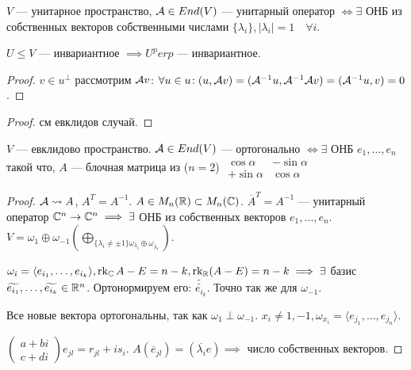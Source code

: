 \begin{theorem}
    $V$ --- унитарное пространство,  $\mathcal{A} \in End(V)$ --- унитарный оператор  $\iff \exists$ ОНБ из собственных векторов  собственными числами  $\{\lambda_i\}, |\lambda_i| = 1 \quad \forall i$.
\end{theorem}
\begin{lemma}
    $U \le V$ --- инвариантное $\implies U^perp$ --- инвариантное.
\end{lemma}
\begin{proof}
    $v \in u^\perp$ рассмотрим  $\mathcal{A} v$:  $\forall u \in u\!: (u, \mathcal{A} v) = (\mathcal{A}^{-1}u, \mathcal{A}^{-1}\mathcal{A} v) = (\mathcal{A}^{-1}u, v) = 0$.
\end{proof}
\begin{proof}
    см евклидов случай.
\end{proof}
\begin{theorem}
    $V$ --- евклидово пространство.  $\mathcal{A} \in End(V)$ --- ортогонально  $\iff \exists$ ОНБ $e_1, \ldots, e_n$ такой что, $A$ --- блочная матрица из ($n=2$)
    $
    \begin{matrix}
        \cos \alpha & -\sin \alpha\\
        +\sin \alpha & \cos \alpha
    \end{matrix}$
\end{theorem}
\begin{proof}
    $\mathcal{A} \leadsto A$,  $A^T = A^{-1}$.  $A \in M_n(\mathbb{R}) \subset M_n(\mathbb{C})$.  $\overline{A}^T = A^{-1}$ --- унитарный оператор $\mathbb{C}^n \to \mathbb{C}^n \implies \exists$ ОНБ из собственных векторов  $e_1, \ldots, e_n$. $V = \omega_1 \oplus \omega_{-1} (\bigoplus\limits_{\{\lambda_i \neq \pm 1\} \omega_{\lambda_i} \oplus \omega_{\overline{\lambda}_i}})$.

    $\omega_i = \langle e_{i_1}, \ldots, e_{i_k} \rangle, \operatorname{rk}_\mathbb{C} A - E = n - k, \operatorname{rk}_\mathbb{R} (A-E) = n - k \implies \exists$ базис $\widetilde{e_{i_1}}, \ldots, \widetilde{e_{i_k}} \in \mathbb{R}^n$. Ортонормируем его: $\widetilde{\widetilde{e_{i_k}}}$. Точно так же для  $\omega_{-1}$.

    Все новые вектора ортогональны, так как  $\omega_{1} \perp \omega_{-1}$.  $x_i \neq 1, -1, \omega_{x_i} = \langle e_{j_1}, \ldots , e_{j_n} \rangle$.

    $\begin{pmatrix} a + bi \\ c + di \end{pmatrix} e_{jl} = r_{jl} + is_{i}$. $A(\overline{e}_{jl}) = (\overline{\lambda_i} e) \implies$ число собственных векторов.
\end{proof}
